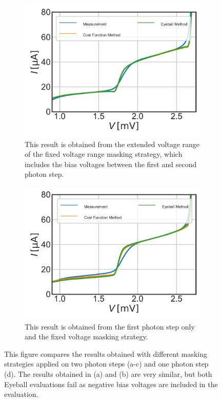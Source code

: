 \documentclass[]{article}
\begin{document}
\begin{figure}
\begin{subfigure}[t]{0.49\textwidth}
	\centering
	\includegraphics[width=\linewidth]{./../Mixer_Unit_Test/2020_01_15_FixedMask_Continuous_Over_Two_Photonsteps/Pumped_Recovered_Comparison_Two_Photon_Steps.pdf}
	\caption{This result is obtained from the extended voltage range of the fixed voltage range masking strategy, which includes the bias voltages between the first and second photon step.}
\end{subfigure}
\begin{subfigure}[t]{0.49\textwidth}
	\centering
	\includegraphics[width=\linewidth]{./../Mixer_Unit_Test/2020_01_14_Fixed_Mask/Pumped_Recovered_Comparison_Two_Photon_Steps.pdf}
	\caption{This result is obtained from the first photon step only and the fixed voltage masking strategy.}
\end{subfigure}
	\caption[]{This figure compares the results obtained with different masking strategies applied on two photon steps (a-c) and one photon step (d). The results obtained in (a) and (b) are very similar, but both Eyeball evaluations fail as negative bias voltages are included in the evaluation.
	}
	\label{fig:Pumped_Recovered_Comparison_Two_Photon_Steps}
\end{figure}
\end{document}
